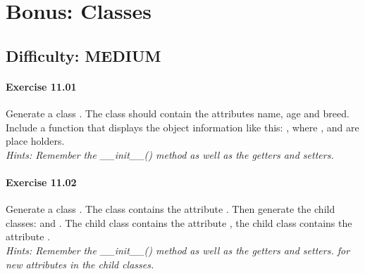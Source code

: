 \chapter{Bonus: Classes}\label{CHAP_Classes}

\section{Difficulty: MEDIUM}

\subsubsection*{Exercise 11.01}
Generate a class {}. The class should contain the attributes name, age and breed. Include a function {} that displays the object information like this:
{}, where {\code{[Name]}}, {\code{[YEARS]}} and {\code{[BREED]}} are place holders.\\


\textit{Hints:
Remember the {\code\_\_init\_\_()} method as well as the getters and setters.}\\[1cm]


\subsubsection*{Exercise 11.02}
Generate a class {}. The class contains the attribute {}. Then generate the child classes: {} and {}. The {} child class contains the attribute {}, the {} child class contains the attribute {}.\\

\textit{Hints:
Remember the {\code\_\_init\_\_()} method as well as the getters and setters. for new attributes in the child classes.}\\[1cm]


